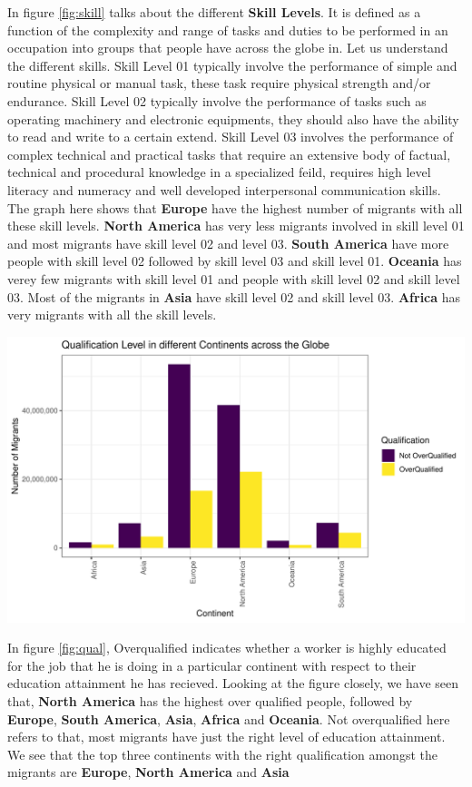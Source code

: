 \documentclass[11pt,a4paper,]{article}
\let\origfigure\figure
\let\endorigfigure\endfigure
\renewenvironment{figure}[1][2] {
    \expandafter\origfigure\expandafter[H]
} {
    \endorigfigure
}%
\begin{document}
In figure \ref{fig:skill} talks about the different \textbf{Skill Levels}. It is defined as a function of the complexity and range of tasks and duties to be performed in an occupation into groups that people have across the globe in. Let us understand the different skills. Skill Level 01 typically involve the performance of simple and routine physical or manual task, these task require physical strength and/or endurance. Skill Level 02 typically involve the performance of tasks such as operating machinery and electronic equipments, they should also have the ability to read and write to a certain extend. Skill Level 03 involves the performance of complex technical and practical tasks that require an extensive body of factual, technical and procedural knowledge in a specialized feild, requires high level literacy and numeracy and well developed interpersonal communication skills. The graph here shows that \textbf{Europe} have the highest number of migrants with all these skill levels. \textbf{North America} has very less migrants involved in skill level 01 and most migrants have skill level 02 and level 03. \textbf{South America} have more people with skill level 02 followed by skill level 03 and skill level 01. \textbf{Oceania} has verey few migrants with skill level 01 and people with skill level 02 and skill level 03. Most of the migrants in \textbf{Asia} have skill level 02 and skill level 03. \textbf{Africa} has very migrants with all the skill levels.

\begin{figure}
\centering
\includegraphics{ETC5513assignment4_files/figure-latex/qual-1.pdf}
\caption{\label{fig:qual}Occupation Types}
\end{figure}

In figure \ref{fig:qual}, Overqualified indicates whether a worker is highly educated for the job that he is doing in a particular continent with respect to their education attainment he has recieved. Looking at the figure closely, we have seen that, \textbf{North America} has the highest over qualified people, followed by \textbf{Europe}, \textbf{South America}, \textbf{Asia}, \textbf{Africa} and \textbf{Oceania}. Not overqualified here refers to that, most migrants have just the right level of education attainment. We see that the top three continents with the right qualification amongst the migrants are \textbf{Europe}, \textbf{North America} and \textbf{Asia}
\end{document}
